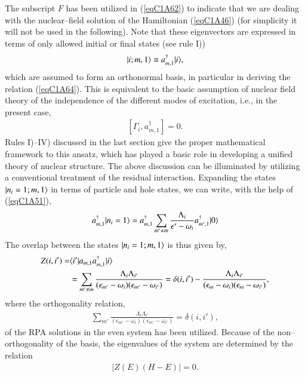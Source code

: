  
The subscript $F$ has been utilized in (\ref{eqC1A62}) to indicate that we are dealing with the nuclear--field solution of the Hamiltonian (\ref{eqC1A46}) (for simplicity it will not be used in the following). Note that these eigenvectors are expressed in terms of only  allowed initial or final states (see rule I)) 
\begin{align}\label{eqC1A65} 
 |{i;m,1} \rangle\equiv a^\dagger_{m,1}|{i} \rangle,
  \end{align}
which are assumed to form an orthonormal basis, in particular in deriving the 
relation (\ref{eqC1A64}). This is equivalent to the basic assumption of  nuclear field theory of the independence of the different modes of excitation, i.e., in the 
present case, 
\begin{align}\label{eqC1A66} 
 [\Gamma_i,a^\dagger_{m,1}]=0.
  \end{align}
Rules I)--IV) discussed in the last section give the proper mathematical framework to this ansatz, which has played a basic role in developing a unified theory of nuclear structure. 
The above discussion can be illuminated by utilizing a conventional treatment of the residual interaction. Expanding the states $|{n_i=1; m,1} \rangle$
in terms of particle and hole states, we can write, with the help of (\ref{eqC1A51}), 
\begin{align}\label{eqC1A66b} 
 a^\dagger_{m,1}|{n_i=1} \rangle=a^\dagger_{m,1}\sum_{m'\neq m}\frac{\Lambda_i}{\epsilon'-\omega_i}a^\dagger_{m',1}|{0} \rangle
  \end{align}
The overlap between the states $|{n_i=1; m,1} \rangle$ is thus given by, 
\begin{align}\label{eqC1A67} 
 \nonumber Z(i,i')=&\langle {i'|a_{m,1}a^\dagger_{m,1}|i} \rangle\\
 &=\sum_{m'\neq m}\frac{\Lambda_i\Lambda_{i'}}{(\epsilon_{m'}-\omega_i)(\epsilon_{m'}-\omega_{i'})}=\delta(i,i')-\frac{\Lambda_i\Lambda_{i'}}{(\epsilon_m-\omega_i)(\epsilon_m-\omega_{i'})},
  \end{align}
where the orthogonality relation,
\begin{align}\label{eqC1A68} 
 \sum_{m'}\frac{\Lambda_i\Lambda_{i'}}{(\epsilon_{m'}-\omega_i)(\epsilon_{m'}-\omega_{i'})}=\delta(i,i'),
  \end{align}
of the RPA solutions in the even system has been utilized. Because of the non--orthogonality of the basis, the eigenvalues of the system are determined 
by the relation
\begin{align}\label{eqC1A69} 
 \left|Z(E)(H-E)\right|=0.
  \end{align}
